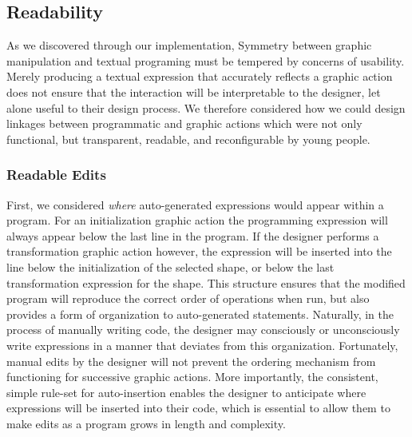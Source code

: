 \documentclass{sigchi}
\begin{document}
\subsection{Readability}
\label{subsec:readability}
As we discovered through our implementation, Symmetry between graphic manipulation and textual programing must be tempered by concerns of usability. Merely producing a textual expression that accurately reflects a graphic action does not ensure that the interaction will be interpretable to the designer, let alone useful to their design process. We therefore considered how we could design linkages between programmatic and graphic actions which were not only functional, but transparent, readable, and reconfigurable by young people. 

\subsubsection{Readable Edits}
First, we considered \textit{where} auto-generated expressions would appear within a program. For an initialization graphic action the programming expression will always appear below the last line in the program. If the designer performs a transformation graphic action however, the expression will be inserted into the line below the initialization of the selected shape, or below the last transformation expression for the shape. This structure ensures that the modified program will reproduce the correct order of operations when run, but also provides a form of organization to auto-generated statements. Naturally, in the process of manually writing code, the designer may consciously or unconsciously write expressions in a manner that deviates from this organization. Fortunately, manual edits by the designer will not prevent the ordering mechanism from functioning for successive graphic actions. More importantly, the consistent, simple rule-set for auto-insertion enables the designer to anticipate where expressions will be inserted into their code, which is essential to allow them to make edits as a program grows in length and complexity.
\end{document}

